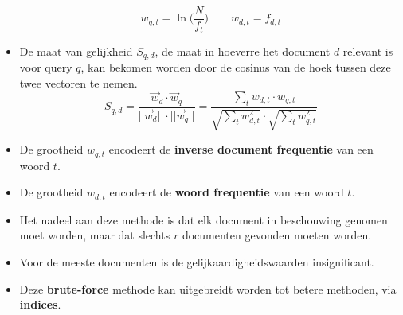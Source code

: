 \begin{itemize}
    $$w_{q, t} = \ln\bigg( \frac{N}{f_t}\bigg) \qquad w_{d, t} = f_{d,t}$$
    \item De maat van gelijkheid $S_{q, d}$, de maat in hoeverre het document $d$ relevant is voor query $q$, kan bekomen worden door de cosinus van de hoek tussen deze twee vectoren te nemen.
    $$S_{q, d} = \frac{\vec{w}_d \cdot \vec{w}_q}{||\vec{w}_d||\cdot ||\vec{w}_q||} = \frac{\sum_t w_{d,t} \cdot w_{q,t}}{\sqrt{\sum_t w^2_{d,t}}\cdot \sqrt{\sum_t w^2_{q,t}}}$$
    \item De grootheid $w_{q, t}$ encodeert de \textbf{inverse document frequentie} van een woord $t$.
    \item De grootheid $w_{d, t}$ encodeert de \textbf{woord frequentie} van een woord $t$.
    \item Het nadeel aan deze methode is dat elk document in beschouwing genomen moet worden, maar dat slechts $r$ documenten gevonden moeten worden.
    \item Voor de meeste documenten is de gelijkaardigheidswaarden insignificant.
    \item Deze \textbf{brute-force} methode kan uitgebreidt worden tot betere methoden, via \textbf{indices}.
\end{itemize}


